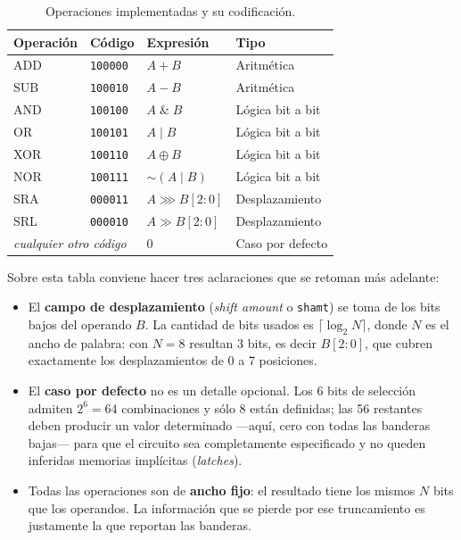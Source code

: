 \documentclass[12pt,a4paper]{article}
\begin{document}
\begin{table}[H]
  \centering
  \begin{tabular}{llll}
    \toprule
    \textbf{Operación} & \textbf{Código} & \textbf{Expresión} & \textbf{Tipo} \\
    \midrule
    ADD & \texttt{100000} & $A + B$                     & Aritmética \\
    SUB & \texttt{100010} & $A - B$                     & Aritmética \\
    AND & \texttt{100100} & $A \;\&\; B$                & Lógica bit a bit \\
    OR  & \texttt{100101} & $A \;|\; B$                 & Lógica bit a bit \\
    XOR & \texttt{100110} & $A \oplus B$                & Lógica bit a bit \\
    NOR & \texttt{100111} & $\sim(A \;|\; B)$           & Lógica bit a bit \\
    SRA & \texttt{000011} & $A \ggg B[2{:}0]$           & Desplazamiento \\
    SRL & \texttt{000010} & $A \gg B[2{:}0]$            & Desplazamiento \\
    \midrule
    \multicolumn{2}{l}{\textit{cualquier otro código}} & $0$ & Caso por defecto \\
    \bottomrule
  \end{tabular}
  \caption{Operaciones implementadas y su codificación.}
  \label{tab:ops}
\end{table}

Sobre esta tabla conviene hacer tres aclaraciones que se retoman más adelante:

\begin{itemize}[leftmargin=1.4em]
  \item El \textbf{campo de desplazamiento} (\textit{shift amount} o \texttt{shamt}) se toma
        de los bits bajos del operando $B$. La cantidad de bits usados es
        $\lceil \log_2 N \rceil$, donde $N$ es el ancho de palabra: con $N=8$ resultan
        3 bits, es decir $B[2{:}0]$, que cubren exactamente los desplazamientos de 0 a 7
        posiciones.
  \item El \textbf{caso por defecto} no es un detalle opcional. Los 6 bits de selección
        admiten $2^6 = 64$ combinaciones y sólo 8 están definidas; las 56 restantes deben
        producir un valor determinado ---aquí, cero con todas las banderas bajas--- para
        que el circuito sea completamente especificado y no queden inferidas memorias
        implícitas (\textit{latches}).
  \item Todas las operaciones son de \textbf{ancho fijo}: el resultado tiene los mismos $N$
        bits que los operandos. La información que se pierde por ese truncamiento es
        justamente la que reportan las banderas.
\end{itemize}
\end{document}
